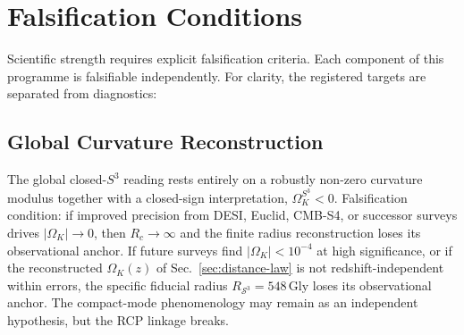\documentclass[aps,prd,onecolumn,superscriptaddress,longbibliography,nofootinbib,notitlepage]{revtex4-2}
\renewcommand{\arraystretch}{1.17}
\newcommand{\Gly}{\,\mathrm{Gly}}
\begin{document}
\section{Falsification Conditions}
\label{sec:falsification}

Scientific strength requires explicit falsification criteria. Each component of
this programme is falsifiable independently. For clarity, the registered targets
are separated from diagnostics:
\begin{center}
\small
\renewcommand{\arraystretch}{1.16}
\end{center}

\subsection{Global Curvature Reconstruction}

The global closed-$S^3$ reading rests entirely on a robustly non-zero curvature
modulus together with a closed-sign interpretation, $\Omega_K^{S^3}<0$.
Falsification condition: if improved precision from DESI, Euclid, CMB-S4, or
successor surveys drives $|\Omega_K|\to0$, then $R_c\to\infty$ and the finite
radius reconstruction loses its observational anchor. If future surveys find
$|\Omega_K| < 10^{-4}$ at high significance, or if the reconstructed
$\Omega_K(z)$ of Sec.~\ref{sec:distance-law} is not redshift-independent within
errors, the specific fiducial radius $R_{\mathcal{S}^3} = 548\Gly$ loses its
observational anchor. The compact-mode phenomenology may remain as an independent
hypothesis, but the RCP linkage breaks.
\end{document}
